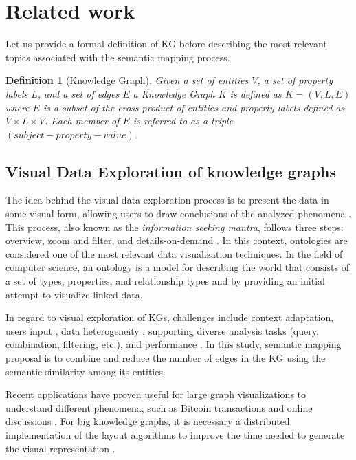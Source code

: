 \documentclass{ieeeaccess}
\newtheorem{Definition}{Definition}
\begin{document}
\section{Related work}
\label{sec:related}

Let us provide a formal definition of KG before describing
the most relevant topics associated with the semantic mapping process.

\begin{Definition}[Knowledge Graph]
Given a set of entities $V$, a set of property labels $L$,
and a set of edges $E$ a Knowledge Graph $K$ is defined as
$K = (V, L, E)$ where $E$ is a subset of the cross
product of entities and property labels defined as 
$V \times L \times V$. Each member of $E$ is referred to as a
triple $(subject-property-value)$.
\end{Definition}

\subsection{Visual Data Exploration of knowledge graphs}
The idea behind the visual data exploration process is to present 
the data in some visual form, allowing users to draw conclusions 
of the analyzed phenomena \cite{keim2001visual}. This process, also
known as the \textit{information seeking mantra}, follows three steps: overview,
zoom and filter, and details-on-demand \cite{Shneiderman96}. In this
context, ontologies are considered one of the most relevant data
visualization techniques. In the field of computer science, an ontology
is a model for describing the world that consists of a set of types,
properties, and relationship types \cite{Garshol2004MetadataTT}
and by providing an initial attempt to visualize linked data.

In regard to visual exploration of KGs, challenges include context
adaptation, users input \cite{Koutra2019}, data heterogeneity
\cite{OntoVis,6787141,1703364}, supporting diverse analysis tasks 
(query, combination, filtering, etc.), and performance
\cite{gomez2018visualizing}. In this study, semantic mapping proposal
is to combine and reduce the number of edges in the KG using the semantic similarity among its
entities.

Recent applications have proven useful for large graph visualizations 
to understand different phenomena, such as Bitcoin transactions 
\cite{mcginn2016visualizing} and online discussions
\cite{molina2017improving}. For big knowledge graphs, it is necessary a
distributed implementation of the layout algorithms to improve the time 
needed to generate the visual representation
\cite{gomez2018visualizing}. 
\end{document}
